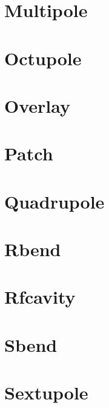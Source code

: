 \section{Multipole}
\label{s:m}

\section{Octupole}
\label{s:oct}

\section{Overlay}
\label{s:over}

\section{Patch}
\label{s:patch}

\section{Quadrupole}
\label{s:quad}

\section{Rbend}
\label{s:rbend}

\section{Rfcavity}
\label{s:rfcav}

\section{Sbend}
\label{s:sbend}

\section{Sextupole}
\label{s:sex}

